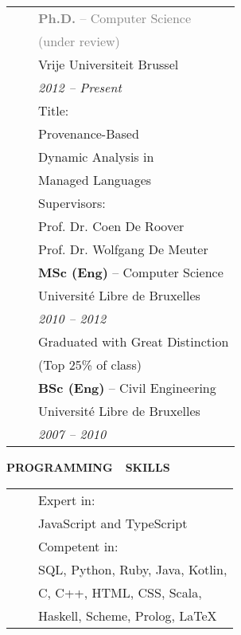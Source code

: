 \documentclass[a4paper,11pt,english]{article}
\newcommand{\LeftColumn}[0]{6.0cm}
\newcommand{\ItemSkip}[0]{4pt}
\newcommand{\SubItemSkip}[0]{0pt}
\newcommand{\SubSubItemSkip}[0]{0pt}
\newcommand{\Bullet}[0]{\faCaretRight~~}
\newcommand{\Rubric}[1]{\colorbox{gray!20}{\parbox{\linewidth}{\centering\sffamily\bfseries{}#1}}}
\begin{document}
\begin{minipage}[t]{\LeftColumn}
\begin{tabular}{@{}l@{}l@{}}
\textcolor{gray}{\Bullet} & \textcolor{gray}{\textbf{Ph.D.} -- Computer Science} \\[\SubSubItemSkip]
& \quad \textcolor{gray}{(under review)} \\[\SubItemSkip]
& Vrije Universiteit Brussel \\[\SubItemSkip]
& \emph{2012 -- Present} \\[\SubItemSkip]
& Title:\\[\SubSubItemSkip]
& \quad Provenance-Based \\[\SubSubItemSkip]
& \quad Dynamic Analysis in \\[\SubSubItemSkip]
& \quad Managed Languages \\[\SubItemSkip]
& Supervisors: \\[\SubSubItemSkip]
& \quad Prof. Dr. Coen De Roover\\[\SubSubItemSkip]
& \quad Prof. Dr. Wolfgang De Meuter\\[\ItemSkip]
\Bullet & \textbf{MSc (Eng)} -- Computer Science \\[\SubItemSkip]
& Université Libre de Bruxelles \\[\SubItemSkip]
& \emph{2010 -- 2012} \\[\SubItemSkip]
& Graduated with Great Distinction \\[\SubSubItemSkip]
& \quad (Top 25\% of class) \\[\ItemSkip]
\Bullet & \textbf{BSc (Eng)} -- Civil Engineering \\[\SubItemSkip]
& Université Libre de Bruxelles \\[\SubItemSkip]
& \emph{2007 -- 2010} \\[0pt]
\end{tabular}

\vspace{12pt}\Rubric{\faCode \quad PROGRAMMING~~SKILLS}\vspace{8pt}

\begin{tabularx}{\linewidth}{@{}l@{}l@{}}
\Bullet & Expert in: \\[0pt]
& \quad JavaScript and TypeScript \\[\ItemSkip]
\Bullet & Competent in: \\[0pt]
& \quad SQL, Python, Ruby, Java, Kotlin, \\[0pt]
& \quad C, C++, HTML, CSS, Scala, \\[0pt]
& \quad Haskell, Scheme, Prolog, LaTeX \\[0pt]
\end{tabularx}

\end{minipage}
\end{document}
